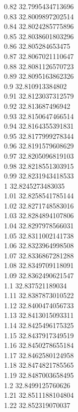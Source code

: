 {0.82	32.7995434713696\\
0.83	32.8009897202514\\
0.84	32.8024285775896\\
0.85	32.8038601803296\\
0.86	32.805284653475\\
0.87	32.8067021110647\\
0.88	32.8081126570723\\
0.89	32.8095163862326\\
0.9	32.810913384802\\
0.91	32.8123037312579\\
0.92	32.813687496942\\
0.93	32.8150647466514\\
0.94	32.8164355391831\\
0.95	32.8177999278344\\
0.96	32.8191579608629\\
0.97	32.8205096819103\\
0.98	32.8218551303915\\
0.99	32.8231943418533\\
1	32.8245273483035\\
1.01	32.8258541785144\\
1.02	32.8271748583016\\
1.03	32.8284894107806\\
1.04	32.8297978566031\\
1.05	32.8311002141738\\
1.06	32.8323964998508\\
1.07	32.8336867281288\\
1.08	32.8349709118091\\
1.09	32.8362490621547\\
1.1	32.837521189034\\
1.11	32.8387873010522\\
1.12	32.8400474056733\\
1.13	32.8413015093311\\
1.14	32.8425496175325\\
1.15	32.8437917349519\\
1.16	32.8450278655184\\
1.17	32.8462580124958\\
1.18	32.8474821785565\\
1.19	32.8487003658495\\
1.2	32.8499125760626\\
1.21	32.8511188104804\\
1.22	32.852319070037\\
}
